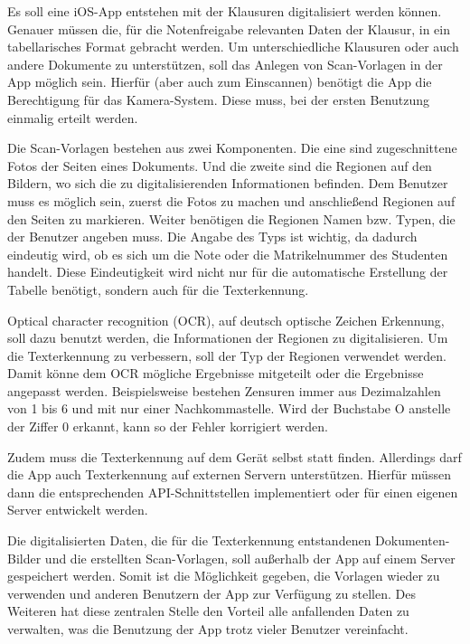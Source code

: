 \documentclass[nomenclature, 150]{HSMW-Thesis}
\begin{document}
	Es soll eine iOS-App entstehen mit der Klausuren digitalisiert werden können. Genauer müssen die, für die Notenfreigabe relevanten Daten der Klausur, in ein tabellarisches Format gebracht werden. Um unterschiedliche Klausuren oder auch andere Dokumente zu unterstützen, soll das Anlegen von Scan-Vorlagen in der App möglich sein. Hierfür (aber auch zum Einscannen) benötigt die App die Berechtigung für das Kamera-System. Diese muss, bei der ersten Benutzung einmalig erteilt werden.
	
	Die Scan-Vorlagen bestehen aus zwei Komponenten. Die eine sind zugeschnittene Fotos der Seiten eines Dokuments. Und die zweite sind die Regionen auf den Bildern, wo sich die zu digitalisierenden Informationen befinden. Dem Benutzer muss es möglich sein, zuerst die Fotos zu machen und anschließend Regionen auf den Seiten zu markieren. Weiter benötigen die Regionen Namen bzw. Typen, die der Benutzer angeben muss. Die Angabe des Typs ist wichtig, da dadurch eindeutig wird, ob es sich um die Note oder die Matrikelnummer des Studenten handelt. Diese Eindeutigkeit wird nicht nur für die automatische Erstellung der Tabelle benötigt, sondern auch für die Texterkennung. 
	
	Optical character recognition (OCR), auf deutsch optische Zeichen Erkennung, soll dazu benutzt werden, die Informationen der Regionen zu digitalisieren. Um die Texterkennung zu verbessern, soll der Typ der Regionen verwendet werden. Damit könne dem OCR mögliche Ergebnisse mitgeteilt oder die Ergebnisse angepasst werden. Beispielsweise bestehen Zensuren immer aus Dezimalzahlen von 1 bis 6 und mit nur einer Nachkommastelle. Wird der Buchstabe O anstelle der Ziffer 0 erkannt, kann so der Fehler korrigiert werden.
	
	Zudem muss die Texterkennung auf dem Gerät selbst statt finden. Allerdings darf die App auch Texterkennung auf externen Servern unterstützen. Hierfür müssen dann die entsprechenden API-Schnittstellen implementiert oder für einen eigenen Server entwickelt werden.

	Die digitalisierten Daten, die für die Texterkennung entstandenen Dokumenten-Bilder und die erstellten Scan-Vorlagen, soll außerhalb der App auf einem Server gespeichert werden. Somit ist die Möglichkeit gegeben, die Vorlagen wieder zu verwenden und anderen Benutzern der App zur Verfügung zu stellen. Des Weiteren hat diese zentralen Stelle den Vorteil alle anfallenden Daten zu verwalten, was die Benutzung der App trotz vieler Benutzer vereinfacht.
	
\end{document}
